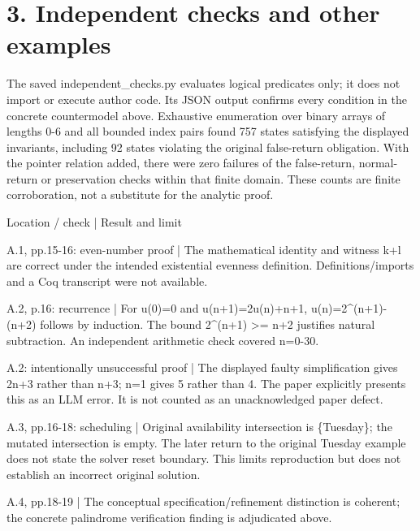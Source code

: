 \documentclass[10pt]{article}
\begin{document}
\section*{3. Independent checks and other examples}
The saved independent\_checks.py evaluates logical predicates only; it does not import or execute author code. Its JSON output confirms every condition in the concrete countermodel above. Exhaustive enumeration over binary arrays of lengths 0-6 and all bounded index pairs found 757 states satisfying the displayed invariants, including 92 states violating the original false-return obligation. With the pointer relation added, there were zero failures of the false-return, normal-return or preservation checks within that finite domain. These counts are finite corroboration, not a substitute for the analytic proof.\par
Location / check | Result and limit\par
A.1, pp.15-16: even-number proof | The mathematical identity and witness k+l are correct under the intended existential evenness definition. Definitions/imports and a Coq transcript were not available.\par
A.2, p.16: recurrence | For u(0)=0 and u(n+1)=2u(n)+n+1, u(n)=2\textasciicircum{}(n+1)-(n+2) follows by induction. The bound 2\textasciicircum{}(n+1) >= n+2 justifies natural subtraction. An independent arithmetic check covered n=0-30.\par
A.2: intentionally unsuccessful proof | The displayed faulty simplification gives 2n+3 rather than n+3; n=1 gives 5 rather than 4. The paper explicitly presents this as an LLM error. It is not counted as an unacknowledged paper defect.\par
A.3, pp.16-18: scheduling | Original availability intersection is \{Tuesday\}; the mutated intersection is empty. The later return to the original Tuesday example does not state the solver reset boundary. This limits reproduction but does not establish an incorrect original solution.\par
A.4, pp.18-19 | The conceptual specification/refinement distinction is coherent; the concrete palindrome verification finding is adjudicated above.\par
\end{document}
